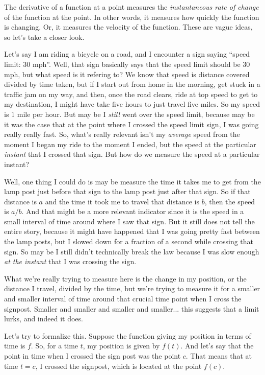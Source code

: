 \documentclass[10pt]{amsart}
\begin{document}
The derivative of a function at a point measures the {\em
instantaneous rate of change} of the function at the point. In other
words, it measures how quickly the function is changing. Or, it
measures the velocity of the function. These are vague ideas, so let's
take a closer look.

Let's say I am riding a bicycle on a road, and I encounter a sign
saying ``speed limit: 30 mph''. Well, that sign basically says that
the speed limit should be 30 mph, but what speed is it refering to? We
know that speed is distance covered divided by time taken, but if I
start out from home in the morning, get stuck in a traffic jam on my
way, and then, once the road clears, ride at top speed to get to my
destination, I might have take five hours to just travel five
miles. So my speed is $1$ mile per hour. But may be I {\em still} went
over the speed limit, because may be it was the case that at the point
where I crossed the speed limit sign, I was going really really
fast. So, what's really relevant isn't my {\em average} speed from the
moment I began my ride to the moment I ended, but the speed at the
particular {\em instant} that I crossed that sign. But how do we
measure the speed at a particular instant?

Well, one thing I could do is may be measure the time it takes me to
get from the lamp post just before that sign to the lamp post just
after that sign. So if that distance is $a$ and the time it took me to
travel that distance is $b$, then the speed is $a/b$. And that might
be a more relevant indicator since it is the speed in a small interval
of time around where I saw that sign. But it still does not tell the
entire story, because it might have happened that I was going pretty
fast between the lamp posts, but I slowed down for a fraction of a
second while crossing that sign. So may be I still didn't technically
break the law because I was slow enough {\em at the instant} that I
was crossing the sign.

What we're really trying to measure here is the change in my position,
or the distance I travel, divided by the time, but we're trying to
measure it for a smaller and smaller interval of time around that
crucial time point when I cross the signpost. Smaller and smaller and
smaller and smaller... this suggests that a limit lurks, and indeed it
does.

Let's try to formalize this. Suppose the function giving my position
in terms of time is $f$. So, for a time $t$, my position is given by
$f(t)$. And let's say that the point in time when I crossed the sign
post was the point $c$. That means that at time $t = c$, I crossed the
signpost, which is located at the point $f(c)$.
\end{document}
